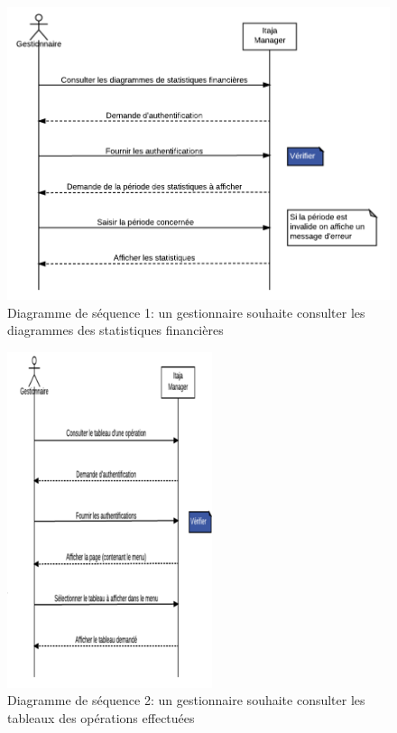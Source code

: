 \documentclass[12pt]{report}
\begin{document}
	\begin{figure}[H]
		\begin{center}
		  \includegraphics[scale=0.7]{images/diagramSequence1.png}
		  \caption{Diagramme de séquence 1: un gestionnaire souhaite consulter les diagrammes des statistiques financières}
		\end{center}
	  \end{figure}
	  
	  \begin{figure}[H]
		\begin{center}
		  \includegraphics[scale=0.7, width=6cm]{images/diagramSequence2.png}
		  \caption{Diagramme de séquence 2: un gestionnaire souhaite consulter les tableaux des opérations effectuées}
		\end{center}
	  \end{figure}
	  
\end{document}
